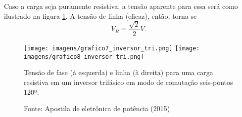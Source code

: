 Caso a carga seja puramente resistiva, a tensão aparente para essa será como ilustrado na figura \ref{g7it}. A tensão de linha (eficaz), então, torna-se \[
V_R = \frac{\sqrt{2} }{2}V
.\] 

 \begin{figure}[h]
\center
\texttt{[image: imagens/grafico7\_inversor\_tri.png]}
\texttt{[image: imagens/grafico8\_inversor\_tri.png]}
\caption{Tensão de fase (à esquerda) e linha (à direita) para uma carga resistiva em um inversor trifásico em modo de comutação seis-pontos 120º.}\label{g7it} 
\caption*{Fonte: Apostila de eletrônica de potência (2015)}
\end{figure}

